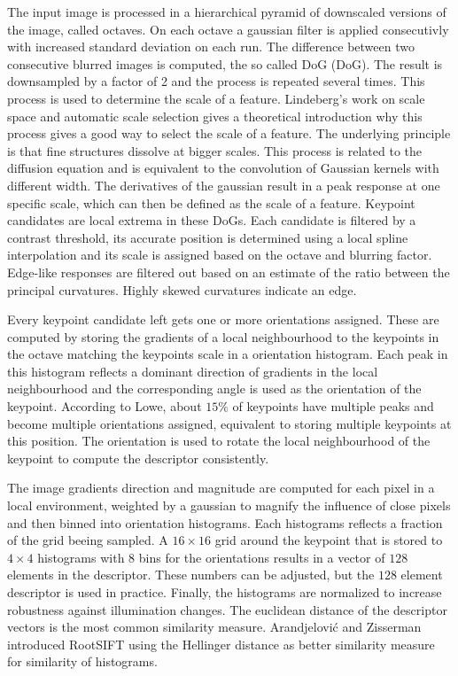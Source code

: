 The input image is processed in a hierarchical pyramid of downscaled versions of the image, called octaves.
On each octave a gaussian filter is applied consecutivly with increased standard deviation on each run.
The difference between two consecutive blurred images is computed, the so called \acrlong{DoG} (\acrshort{DoG}).
The result is downsampled by a factor of 2 and the process is repeated several times.
This process is used to determine the scale of a feature.
Lindeberg's\cite{lindeberg_ijcv98} work on scale space and automatic scale selection gives a theoretical introduction why this process gives a good way to select the scale of a feature.
The underlying principle is that fine structures dissolve at bigger scales.
This process is related to the diffusion equation and is equivalent to the convolution of Gaussian kernels with different width.
The derivatives of the gaussian result in a peak response at one specific scale, which can then be defined as the scale of a feature.
Keypoint candidates are local extrema in these \acrshort{DoG}s.
Each candidate is filtered by a contrast threshold, its accurate position is determined using a local spline interpolation and its scale is assigned based on the octave and blurring factor.
Edge-like responses are filtered out based on an estimate of the ratio between the principal curvatures.
Highly skewed curvatures indicate an edge.

Every keypoint candidate left gets one or more orientations assigned.
These are computed by storing the gradients of a local neighbourhood to the keypoints in the octave matching the keypoints scale in a orientation histogram.
Each peak in this histogram reflects a dominant direction of gradients in the local neighbourhood and the corresponding angle is used as the orientation of the keypoint.
According to Lowe, about $15\%$ of keypoints have multiple peaks and become multiple orientations assigned, equivalent to storing multiple keypoints at this position.
The orientation is used to rotate the local neighbourhood of the keypoint to compute the descriptor consistently.

The image gradients direction and magnitude are computed for each pixel in a local environment, weighted by a gaussian to magnify the influence of close pixels and then binned into orientation histograms.
Each histograms reflects a fraction of the grid beeing sampled.
A $16 \times 16$ grid around the keypoint that is stored to $4 \times 4$ histograms with $8$ bins for the orientations results in a vector of $128$ elements in the descriptor.
These numbers can be adjusted, but the $128$ element descriptor is used in practice.
Finally, the histograms are normalized to increase robustness against illumination changes.
The euclidean distance of the descriptor vectors is the most common similarity measure.
Arandjelović and Zisserman\cite{arandjelovic_2012} introduced RootSIFT using the Hellinger distance\cite{hellinger_1909} as better similarity measure for similarity of histograms.

